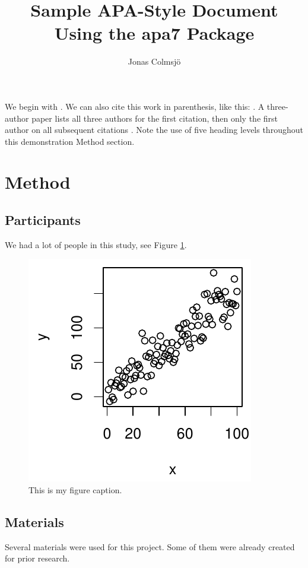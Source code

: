 \documentclass[stu,floatsintext]{apa7}
\title{Sample APA-Style Document Using the \textsf{apa7} Package}
\author{Jonas Colmsjö}
\affiliation{Gothenburg University, Department of Psychology}
\begin{document}
\maketitle

We begin with \textcite{thaler_nudge_2008}.  We can also cite this work in
parenthesis, like this: \parencite{thaler_nudge_2008}.
A three-author paper \parencite[e.g.,][]{anicich_hierarchical_2015} lists all
three authors for the first citation, then only the first author
on all subsequent citations \parencite{anicich_hierarchical_2015}.
Note the use of five heading levels throughout this demonstration
Method section.

\section{Method}
\subsection{Participants}
We had a lot of people in this study, see Figure \ref{fig:Figure1}.

\begin{figure}[h]
  \caption{ This is my figure caption.}
    \label{fig:Figure1}
  \includegraphics{./Figure1.pdf}
\end{figure}

\subsection{Materials}
Several materials were used for this project.  Some of them were
already created for prior research.
\end{document}
